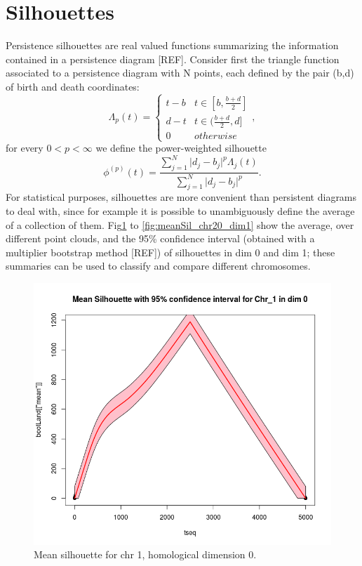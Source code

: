 \documentclass[12pt,a4paper]{article}
\begin{document}
\section{Silhouettes}
Persistence silhouettes are real valued functions summarizing the information contained in a persistence diagram [REF]. 
Consider first the triangle function associated to a persistence diagram with N points, each defined by the pair (b,d) of birth and death coordinates:
\begin{equation}
\Lambda_p(t)=\left\{
\begin{array}{cc}
t-b & t \in [b,\frac{b+d}{2}] \\ 
d-t & t \in (\frac{b+d}{2},d] \\ 
0 & otherwise
\end{array}\right., 
\end{equation}
for every $0<p<\infty$ we define the power-weighted silhouette
\begin{equation}
\phi^{(p)}(t) = \frac{\sum_{j=1}^N \vert d_j-b_j \vert^p \Lambda_j(t)}{\sum_{j=1}^N \vert d_j - b_j\vert^p}.
\end{equation}
For statistical purposes, silhouettes are more convenient than persistent diagrams to deal with, since for example it is 
possible to unambiguously define the average of a collection of them. Fig\ref{fig:meanSil_chr1_dim0} to \ref{fig:meanSil_chr20_dim1} show the 
average, over different point clouds, and the 95\% confidence interval 
(obtained with a multiplier bootstrap method [REF]) of silhouettes in dim 0 and dim 1; these summaries can be used to classify and compare different chromosomes.

\begin{figure}[hbtp]
\centering
\includegraphics[scale=0.75]{meanSil_chr1_dim0.png}
\caption{Mean silhouette for chr 1, homological dimension 0.}
\label{fig:meanSil_chr1_dim0}
\end{figure}
\end{document}
